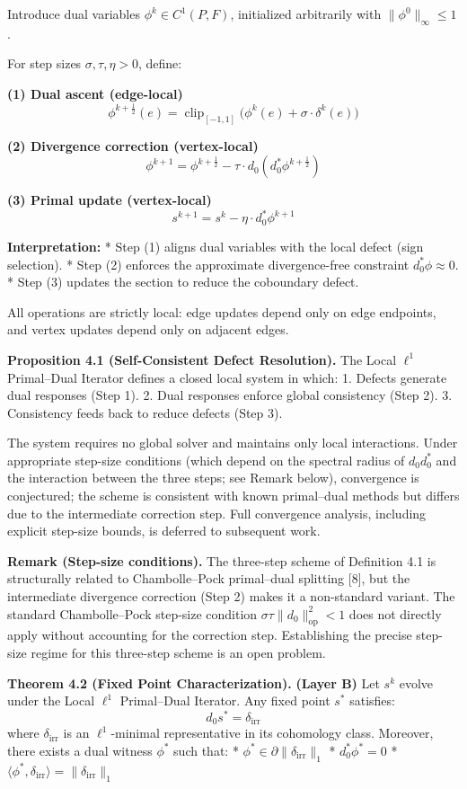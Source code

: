 \documentclass[
]{article}
\begin{document}
Introduce dual variables \(\phi^k \in C^1(P, F)\), initialized
arbitrarily with \(\|\phi^0\|_\infty \le 1\).

For step sizes \(\sigma, \tau, \eta > 0\), define:

\textbf{(1) Dual ascent (edge-local)}
\[ \phi^{k+\frac{1}{2}}(e) = \operatorname{clip}_{[-1,1]} \Big( \phi^k(e) + \sigma \cdot \delta^k(e) \Big) \]

\textbf{(2) Divergence correction (vertex-local)}
\[ \phi^{k+1} = \phi^{k+\frac{1}{2}} - \tau \cdot d_0 (d_0^* \phi^{k+\frac{1}{2}}) \]

\textbf{(3) Primal update (vertex-local)}
\[ s^{k+1} = s^k - \eta \cdot d_0^* \phi^{k+1} \]

\textbf{Interpretation:} * Step (1) aligns dual variables with the local
defect (sign selection). * Step (2) enforces the approximate
divergence-free constraint \(d_0^* \phi \approx 0\). * Step (3) updates
the section to reduce the coboundary defect.

All operations are strictly local: edge updates depend only on edge
endpoints, and vertex updates depend only on adjacent edges.

\textbf{Proposition 4.1 (Self-Consistent Defect Resolution).} The Local
\(\ell^1\) Primal--Dual Iterator defines a closed local system in which:
1. Defects generate dual responses (Step 1). 2. Dual responses enforce
global consistency (Step 2). 3. Consistency feeds back to reduce defects
(Step 3).

The system requires no global solver and maintains only local
interactions. Under appropriate step-size conditions (which depend on
the spectral radius of \(d_0 d_0^*\) and the interaction between the
three steps; see Remark below), convergence is conjectured; the scheme
is consistent with known primal--dual methods but differs due to the
intermediate correction step. Full convergence analysis, including
explicit step-size bounds, is deferred to subsequent work.

\textbf{Remark (Step-size conditions).} The three-step scheme of
Definition 4.1 is structurally related to Chambolle--Pock primal--dual
splitting {[}8{]}, but the intermediate divergence correction (Step 2)
makes it a non-standard variant. The standard Chambolle--Pock step-size
condition \(\sigma \tau \|d_0\|^2_{\mathrm{op}} < 1\) does not directly
apply without accounting for the correction step. Establishing the
precise step-size regime for this three-step scheme is an open problem.

\textbf{Theorem 4.2 (Fixed Point Characterization).} \textbf{(Layer B)}
Let \(s^k\) evolve under the Local \(\ell^1\) Primal--Dual Iterator. Any
fixed point \(s^*\) satisfies: \[ d_0 s^* = \delta_{\mathrm{irr}} \]
where \(\delta_{\mathrm{irr}}\) is an \(\ell^1\)-minimal representative
in its cohomology class. Moreover, there exists a dual witness
\(\phi^*\) such that: *
\(\phi^* \in \partial \|\delta_{\mathrm{irr}}\|_1\) *
\(d_0^* \phi^* = 0\) *
\(\langle \phi^*, \delta_{\mathrm{irr}} \rangle = \|\delta_{\mathrm{irr}}\|_1\)
\end{document}
